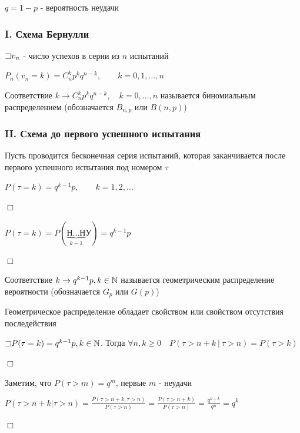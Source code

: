 \documentclass[12pt]{article}
\begin{document}
    $q = 1 - p$ - вероятность неудачи

    \subsubsection{I. Схема Бернулли}

    $\mathord{\sqsupset} v_n$ - число успехов в серии из $n$ испытаний

    $P_n(v_n = k) = C^k_n p^k q^{n - k}, \quad\quad k = 0, 1, \dots, n$

    \Def Соответствие $k \rightarrow C^k_n p^k q^{n - k}, \quad k = 0, \dots, n$ называется биномиальным распределением
    (обозначается $B_{n,p}$ или $B(n, p)$)

    \subsubsection{II. Схема до первого успешного испытания}

    Пусть проводится бесконечная серия испытаний, которая заканчивается после первого успешного испытания
    под номером $\tau$

    \begin{MyTheorem}
        \Ths $P(\tau = k) = q^{k - 1} p, \quad\quad k = 1, 2, \dots$
    \end{MyTheorem}

    \begin{MyProof}
        $\Box$

        $P(\tau = k) = P(\underset{k - 1}{\underbrace{\text{Н}\dots\text{Н}}}\text{У}) = q^{k - 1}p$

        $\Box$
    \end{MyProof}

    \Def Соответствие $k \rightarrow q^{k - 1} p, k \in \mathbb{N}$ называется геометрическим
    распределение вероятности (обозначается $G_p$ или $G(p)$)

    \Nota Геометрическое распределение обладает свойством  или свойством отсутствия
    последействия

    \begin{MyTheorem}
        \Ths $\mathord{\sqsupset} P(\tau = k) = q^{k - 1} p, k \in \mathbb{N}$. Тогда $\forall n, k \geq 0 \quad P(\tau > n + k \ | \ \tau > n) = P(\tau > k)$
    \end{MyTheorem}

    \begin{MyProof}
        $\Box$

        Заметим, что $P(\tau > m) = q^m$, первые $m$ - неудачи

        $P(\tau > n + k | \tau > n) = \frac{P(\tau > n + k, \tau > n)}{P(\tau > n)} = \frac{P(\tau > n + k)}{P(\tau > n)} = \frac{q^{n + k}}{q^n} = q^k$

        $\Box$
    \end{MyProof}
\end{document}
